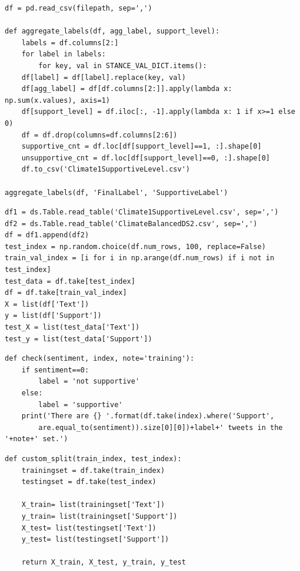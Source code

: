 \documentclass{article} %
\begin{document}
\lstset{language=Python}
\lstset{frame=lines}
\lstset{basicstyle=\footnotesize}
\begin{lstlisting}
df = pd.read_csv(filepath, sep=',')

def aggregate_labels(df, agg_label, support_level):
	labels = df.columns[2:]
	for label in labels:
		for key, val in STANCE_VAL_DICT.items():
	df[label] = df[label].replace(key, val)
	df[agg_label] = df[df.columns[2:]].apply(lambda x: np.sum(x.values), axis=1)
	df[support_level] = df.iloc[:, -1].apply(lambda x: 1 if x>=1 else 0)
	df = df.drop(columns=df.columns[2:6])
	supportive_cnt = df.loc[df[support_level]==1, :].shape[0]
	unsupportive_cnt = df.loc[df[support_level]==0, :].shape[0]
	df.to_csv('Climate1SupportiveLevel.csv')

aggregate_labels(df, 'FinalLabel', 'SupportiveLabel')
\end{lstlisting}


\lstset{language=Python}
\lstset{frame=lines}
\lstset{basicstyle=\footnotesize}
\begin{lstlisting}
df1 = ds.Table.read_table('Climate1SupportiveLevel.csv', sep=',')
df2 = ds.Table.read_table('ClimateBalancedDS2.csv', sep=',')
df = df1.append(df2)
test_index = np.random.choice(df.num_rows, 100, replace=False)
train_val_index = [i for i in np.arange(df.num_rows) if i not in test_index]
test_data = df.take[test_index]
df = df.take[train_val_index]
X = list(df['Text'])
y = list(df['Support'])
test_X = list(test_data['Text'])
test_y = list(test_data['Support'])
\end{lstlisting}


\lstset{language=Python}
\lstset{frame=lines}
\lstset{basicstyle=\footnotesize}
\begin{lstlisting}
def check(sentiment, index, note='training'):
	if sentiment==0:
		label = 'not supportive'
	else:
		label = 'supportive'
	print('There are {} '.format(df.take(index).where('Support', 
		are.equal_to(sentiment)).size[0][0])+label+' tweets in the '+note+' set.')
\end{lstlisting}

\lstset{language=Python}
\lstset{frame=lines}
\lstset{basicstyle=\footnotesize}
\begin{lstlisting}
def custom_split(train_index, test_index):
	trainingset = df.take(train_index)
	testingset = df.take(test_index)    
	
	X_train= list(trainingset['Text'])
	y_train= list(trainingset['Support'])
	X_test= list(testingset['Text'])
	y_test= list(testingset['Support'])
	
	return X_train, X_test, y_train, y_test
\end{lstlisting}
\end{document}
